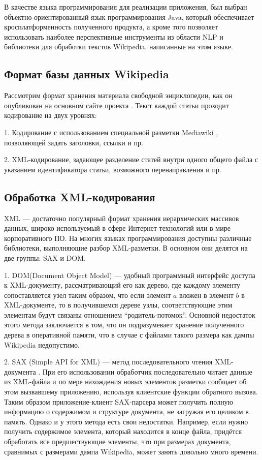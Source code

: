 В качестве языка программирования для реализации приложения,
был выбран объектно-ориентированный язык программирования Java, 
который обеспечивает кросплатформенность полученного продукта,
а кроме того позволяет использовать наиболее перспективные инструменты из области
NLP и библиотеки для обработки текстов Wikipedia, написанные на этом языке.

\subsection{Формат базы данных Wikipedia}

Рассмотрим формат хранения материала свободной энциклопедии, как он
опубликован на основном сайте проекта \cite{download}. Текст каждой статьи проходит
кодирование на двух уровнях:

1. Кодирование с использованием специальной разметки Mediawiki \cite{wikimarkup},
позволяющей задать заголовки, ссылки и пр.

2. XML-кодирование, задающее разделение статей внутри одного общего
файла с указанием идентификатора статьи, возможного перенаправления и
пр.

\subsection{Обработка XML-кодирования}

XML --- достаточно популярный формат хранения иерархических массивов
данных, широко используемый в сфере Интернет-технологий или в мире
корпоративного ПО. На многих языках программирования доступны
различные библиотеки, выполняющие разбор XML-разметки. В основном они
делятся на две группы: SAX и DOM.

1. DOM(Document Object Model) \cite{dom} --- удобный программный интерфейс доступа 
к XML-документу, рассматривающий его как дерево, где каждому элементу 
сопоставляется узел таким образом, что если элемент $a$ вложен в элемент $b$ 
в XML-документе, то в получившемся дереве узлы, соответствующие этим элементам 
будут связаны отношением “родитель-потомок”.
Основной недостаток этого метода заключается в том, что он подразумевает хранение 
полученного дерева в оперативной памяти, что в случае с файлами такого размера 
как дампы Wikipedia недопустимо.

2. SAX (Simple API for XML) --- метод последовательного чтения XML-документа \cite{sax}. 
При его использовании обработчик последовательно читает данные
из XML-файла и по мере нахождения новых элементов разметки сообщает об этом вызвавшему приложению, 
используя клиентские функции обратного вызова\cite{callback}. Таким образом приложение-клиент 
SAX-парсера может получить полную информацию о содержимом и структуре документа,
не загружая его целиком в память. Однако и у этого метода есть свои недостатки. 
Например, если нужно получить содержимое элемента, который находится в конце файла,
придётся обработать все предшествующие элементы, что при размерах документа, сравнимых
с размерами дампа Wikipedia, может занять довольно много времени.

